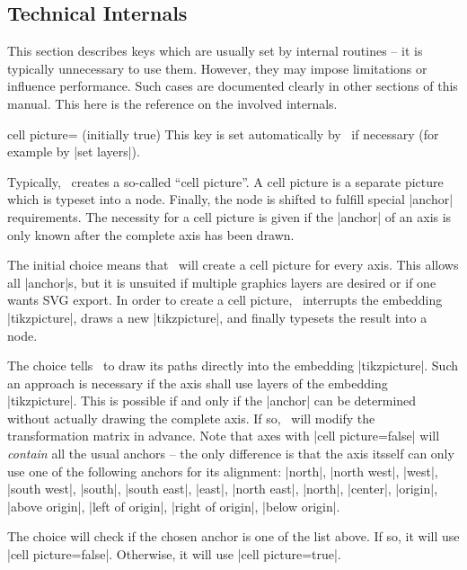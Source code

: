 \subsection{Technical Internals}
{
%

This section describes keys which are usually set by internal routines -- it is typically unnecessary to use them. However, they may impose limitations or influence performance. Such cases are documented clearly in other sections of this manual. This here is the reference on the involved internals.

\begin{pgfplotskey}{cell picture= (initially true)}
	This key is set automatically by \PGFPlots\ if necessary (for example by |set layers|).

	Typically, \PGFPlots\ creates a so-called ``cell picture''. A cell picture is a separate picture which is typeset into a node. Finally, the node is shifted to fulfill special |anchor| requirements. The necessity for a cell picture is given if the |anchor| of an axis is only known after the complete axis has been drawn.

	The initial choice  means that \PGFPlots\ will create a cell picture for every axis. This allows all |anchor|s, but it is unsuited if multiple graphics layers are desired or if one wants SVG export. In order to create a cell picture, \PGFPlots\ interrupts the embedding |tikzpicture|, draws a new |tikzpicture|, and finally typesets the result into a node.

	The choice  tells \PGFPlots\ to draw its paths directly into the embedding |tikzpicture|. Such an approach is necessary if the axis shall use layers of the embedding |tikzpicture|. This is possible if and only if the |anchor| can be determined without actually drawing the complete axis. If so, \PGFPlots\ will modify the transformation matrix in advance. Note that axes with |cell picture=false| will \emph{contain} all the usual anchors -- the only difference is that the axis itsself can only use one of the following anchors for its alignment: |north|, |north west|, |west|, |south west|, |south|, |south east|, |east|, |north east|, |north|, |center|, |origin|, |above origin|, |left of origin|, |right of origin|, |below origin|.

	The choice  will check if the chosen anchor is one of the list above. If so, it will use |cell picture=false|. Otherwise, it will use |cell picture=true|.


\end{pgfplotskey}}
